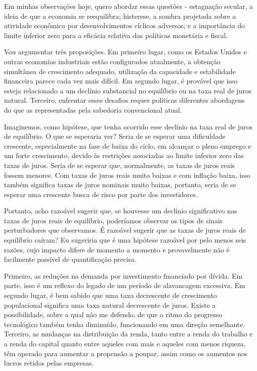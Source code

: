 Em minhas observações hoje, quero abordar essas questões - estagnação secular, a ideia de que a economia se reequilibra; histerese, a sombra projetada sobre a atividade econômica por desenvolvimentos cíclicos adversos; e a importância do limite inferior zero para a eficácia relativa das políticas monetária e fiscal.

Vou argumentar três proposições. Em primeiro lugar, como os Estados Unidos e outras economias industriais estão configurados atualmente, a obtenção simultânea de crescimento adequado, utilização da capacidade e estabilidade financeira parece cada vez mais difícil. Em segundo lugar, é provável que isso esteja relacionado a um declínio substancial no equilíbrio ou na taxa real de juros natural. Terceiro, enfrentar esses desafios requer políticas diferentes abordagens do que as representadas pela sabedoria convencional atual.

Imaginemos, como hipótese, que tenha ocorrido esse declínio na taxa real de juros de equilíbrio. O que se esperaria ver? Seria de se esperar uma dificuldade crescente, especialmente na fase de baixa do ciclo, em alcançar o pleno emprego e um forte crescimento, devido às restrições associadas ao limite inferior zero das taxas de juros. Seria de se esperar que, normalmente, as taxas de juros reais fossem menores. Com taxas de juros reais muito baixas e com inflação baixa, isso também significa taxas de juros nominais muito baixas, portanto, seria de se esperar uma crescente busca de risco por parte dos investidores.

Portanto, acho razoável sugerir que, se houvesse um declínio significativo nas taxas de juros reais de equilíbrio, poderíamos observar os tipos de sinais perturbadores que observamos. É razoável sugerir que as taxas de juros reais de equilíbrio caíram?
Eu sugeriria que é uma hipótese razoável por pelo menos seis razões, cujo impacto difere de momento a momento e provavelmente não é facilmente passível de quantificação precisa.

Primeiro, as reduções na demanda por investimento financiado por dívida. Em parte, isso é um reflexo do legado de um período de alavancagem excessiva. Em segundo lugar, é bem sabido que uma taxa decrescente de crescimento populacional significa uma taxa natural decrescente de juros. Existe a possibilidade, sobre a qual não me defendo, de que o ritmo do progresso tecnológico também tenha diminuído, funcionando em uma direção semelhante. Terceiro, as mudanças na distribuição da renda, tanto entre a renda do trabalho e a renda do capital quanto entre aqueles com mais e aqueles com menos riqueza, têm operado para aumentar a propensão a poupar, assim como os aumentos nos lucros retidos pelas empresas.

